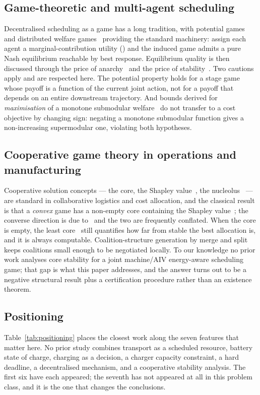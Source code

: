 \documentclass[preprint, 3p, review, 12pt]{elsarticle}
\theoremstyle{definition}
\begin{document}
\subsection{Game-theoretic and multi-agent scheduling}
Decentralised scheduling as a game has a long tradition, with potential
games~\citep{monderer1996potential} and distributed welfare games~\citep{marden2009cooperative}
providing the standard machinery: assign each agent a marginal-contribution utility
(\citealp{9241495, chapman2009}) and the induced game admits a pure Nash equilibrium
reachable by best response. Equilibrium quality is then discussed through the price of
anarchy~\citep{koutsoupias2009worst} and the price of stability~\citep{anshelevich2008price}.
Two cautions apply and are respected here. The potential property holds for a stage game
whose payoff is a function of the current joint action, not for a payoff that depends on an
entire downstream trajectory. And bounds derived for \emph{maximisation} of a monotone
submodular welfare~\citep{1181966} do not transfer to a cost objective by changing sign:
negating a monotone submodular function gives a non-increasing supermodular one, violating
both hypotheses.

\subsection{Cooperative game theory in operations and manufacturing}
Cooperative solution concepts --- the core, the Shapley value~\citep{shapley1971cores}, the
nucleolus~\citep{schmeidler1969nucleolus} --- are standard in collaborative logistics and
cost allocation, and the classical result is that a \emph{convex} game has a non-empty core
containing the Shapley value~\citep{shapley1971cores}; the converse direction is due
to~\citet{ichiishi1981super} and the two are frequently conflated. When the core is empty,
the least core~\citep{maschler1979geometric} still quantifies how far from stable the best
allocation is, and it is always computable. Coalition-structure generation by merge and
split~\citep{apt2009stable, saad2009coalitional} keeps coalitions small enough to be
negotiated locally. To our knowledge no prior work analyses core stability for a joint
machine/AIV energy-aware scheduling game; that gap is what this paper addresses, and the
answer turns out to be a negative structural result plus a certification procedure rather
than an existence theorem.

\subsection{Positioning}
Table~\ref{tab:positioning} places the closest work along the seven features that matter
here. No prior study combines transport as a scheduled resource, battery state of charge,
charging as a decision, a charger capacity constraint, a hard deadline, a decentralised
mechanism, and a cooperative stability analysis. The first six have each appeared; the
seventh has not appeared at all in this problem class, and it is the one that changes the
conclusions.
\end{document}

